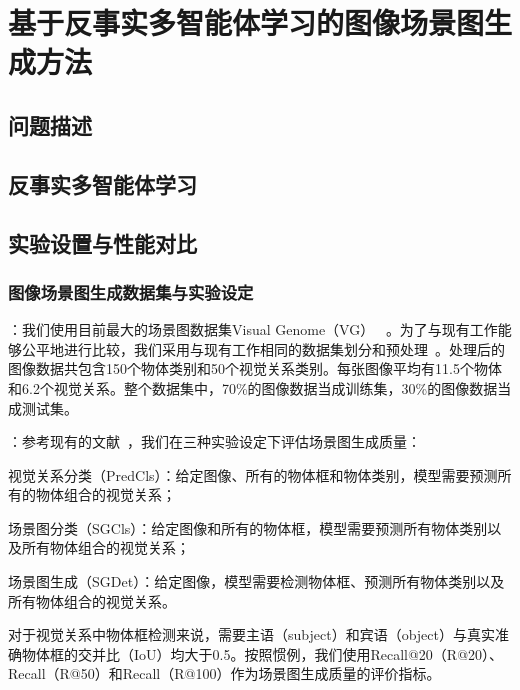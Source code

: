 \chapter{基于反事实多智能体学习的图像场景图生成方法}

\section{问题描述}

\section{反事实多智能体学习}

\section{实验设置与性能对比}
\subsection{图像场景图生成数据集与实验设定}

：我们使用目前最大的场景图数据集Visual Genome（VG） ~\cite{krishna2017visual}。为了与现有工作能够公平地进行比较，我们采用与现有工作相同的数据集划分和预处理~\cite{xu2017scene, zellers2018neural, newell2017pixels, yang2018graph, herzig2018mapping}。处理后的图像数据共包含150个物体类别和50个视觉关系类别。每张图像平均有11.5个物体和6.2个视觉关系。整个数据集中，70\%的图像数据当成训练集，30\%的图像数据当成测试集。


：参考现有的文献~\cite{xu2017scene, zellers2018neural, jae2018tensorize}，我们在三种实验设定下评估场景图生成质量：
\begin{asparaenum}
\item 视觉关系分类（PredCls）：给定图像、所有的物体框和物体类别，模型需要预测所有的物体组合的视觉关系；

\item 场景图分类（SGCls）：给定图像和所有的物体框，模型需要预测所有物体类别以及所有物体组合的视觉关系；

\item 场景图生成（SGDet）：给定图像，模型需要检测物体框、预测所有物体类别以及所有物体组合的视觉关系。
\end{asparaenum}

对于视觉关系中物体框检测来说，需要主语（subject）和宾语（object）与真实准确物体框的交并比（IoU）均大于0.5。按照惯例，我们使用Recall@20（R@20）、Recall（R@50）和Recall（R@100）作为场景图生成质量的评价指标。


